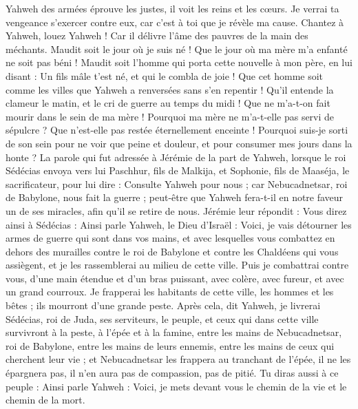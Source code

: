 \begin{multicols}{2}
Yahweh des armées éprouve les justes, il voit les reins et les cœurs. Je verrai ta vengeance s'exercer contre eux, car c'est à toi que je révèle ma cause.
Chantez à Yahweh, louez Yahweh ! Car il délivre l'âme des pauvres de la main des méchants.
Maudit soit le jour où je suis né ! Que le jour où ma mère m'a enfanté ne soit pas béni !
Maudit soit l'homme qui porta cette nouvelle à mon père, en lui disant : Un fils mâle t'est né, et qui le combla de joie !
Que cet homme soit comme les villes que Yahweh a renversées sans s'en repentir ! Qu'il entende la clameur le matin, et le cri de guerre au temps du midi !
Que ne m'a-t-on fait mourir dans le sein de ma mère ! Pourquoi ma mère ne m'a-t-elle pas servi de sépulcre ? Que n'est-elle pas restée éternellement enceinte !
Pourquoi suis-je sorti de son sein pour ne voir que peine et douleur, et pour consumer mes jours dans la honte ?
\VerseOne{}La parole qui fut adressée à Jérémie de la part de Yahweh, lorsque le roi Sédécias envoya vers lui Paschhur, fils de Malkija, et Sophonie, fils de Maaséja, le sacrificateur, pour lui dire :
Consulte Yahweh pour nous ; car Nebucadnetsar, roi de Babylone, nous fait la guerre ; peut-être que Yahweh fera-t-il en notre faveur un de ses miracles, afin qu'il se retire de nous.
Jérémie leur répondit : Vous direz ainsi à Sédécias :
Ainsi parle Yahweh, le Dieu d'Israël : Voici, je vais détourner les armes de guerre qui sont dans vos mains, et avec lesquelles vous combattez en dehors des murailles contre le roi de Babylone et contre les Chaldéens qui vous assiègent, et je les rassemblerai au milieu de cette ville.
Puis je combattrai contre vous, d'une main étendue et d'un bras puissant, avec colère, avec fureur, et avec un grand courroux.
Je frapperai les habitants de cette ville, les hommes et les bêtes ; ils mourront d'une grande peste.
Après cela, dit Yahweh, je livrerai Sédécias, roi de Juda, ses serviteurs, le peuple, et ceux qui dans cette ville survivront à la peste, à l'épée et à la famine, entre les mains de Nebucadnetsar, roi de Babylone, entre les mains de leurs ennemis, entre les mains de ceux qui cherchent leur vie ; et Nebucadnetsar les frappera au tranchant de l'épée, il ne les épargnera pas, il n'en aura pas de compassion, pas de pitié.
Tu diras aussi à ce peuple : Ainsi parle Yahweh : Voici, je mets devant vous le chemin de la vie et le chemin de la mort.

\end{multicols}
